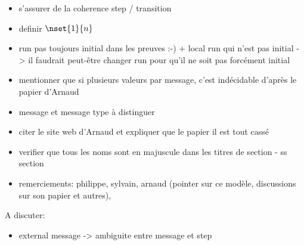 \begin{itemize}
	\item s'assurer de la coherence step / transition
    \item definir $\nset{1}{n}$
    \item run pas toujours initial dans les preuves :-) + local run qui n'est pas initial -> il faudrait peut-être changer run pour qu'il ne soit pas forcément initial
    \item mentionner que si plusieurs valeurs par message, c'est indécidable d'après le papier d'Arnaud
    \item message et message type à distinguer 
    \item citer le site web d'Arnaud et expliquer que le papier il est tout cassé
    \item verifier que tous les noms sont en majuscule dans les titres de section - ss section
    \item remerciements: philippe, sylvain, arnaud (pointer sur ce modèle, discussions sur son papier et autres), 
\end{itemize}

A discuter:
\begin{itemize}
\item external message -> ambiguite entre message et step 
\end{itemize}